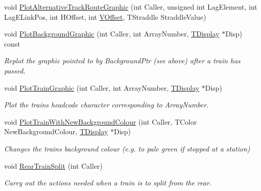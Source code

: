 \begin{DoxyCompactItemize}
\item 
void \mbox{\hyperlink{class_t_train_aa21e18b3085773ca8351c446911611c1}{Plot\+Alternative\+Track\+Route\+Graphic}} (int Caller, unsigned int Lag\+Element, int Lag\+E\+Link\+Pos, int H\+Offset, int \mbox{\hyperlink{class_t_train_a4c8b153a620229a3d9cc54f64ffa5f4a}{V\+Offset}}, T\+Straddle Straddle\+Value)
\item 
\mbox{\label{class_t_train_abb6bb7d2024ac59230cbaff2ec3ee999}} 
void \mbox{\hyperlink{class_t_train_abb6bb7d2024ac59230cbaff2ec3ee999}{Plot\+Background\+Graphic}} (int Caller, int Array\+Number, \mbox{\hyperlink{class_t_display}{T\+Display}} $\ast$Disp) const
\begin{DoxyCompactList}\small\item\em Replot the graphic pointed to by Background\+Ptr (see above) after a train has passed. \end{DoxyCompactList}\item 
\mbox{\label{class_t_train_a247bd95a7c648367736b116f553f4e54}} 
void \mbox{\hyperlink{class_t_train_a247bd95a7c648367736b116f553f4e54}{Plot\+Train\+Graphic}} (int Caller, int Array\+Number, \mbox{\hyperlink{class_t_display}{T\+Display}} $\ast$Disp)
\begin{DoxyCompactList}\small\item\em Plot the train\textquotesingle{}s headcode character corresponding to Array\+Number. \end{DoxyCompactList}\item 
\mbox{\label{class_t_train_abfa6da75d034c737d53819e6edbfa3dc}} 
void \mbox{\hyperlink{class_t_train_abfa6da75d034c737d53819e6edbfa3dc}{Plot\+Train\+With\+New\+Background\+Colour}} (int Caller, T\+Color New\+Background\+Colour, \mbox{\hyperlink{class_t_display}{T\+Display}} $\ast$Disp)
\begin{DoxyCompactList}\small\item\em Changes the train\textquotesingle{}s background colour (e.\+g. to pale green if stopped at a station) \end{DoxyCompactList}\item 
\mbox{\label{class_t_train_ad64c5823265b0c611c2e5f0613317aa5}} 
void \mbox{\hyperlink{class_t_train_ad64c5823265b0c611c2e5f0613317aa5}{Rear\+Train\+Split}} (int Caller)
\begin{DoxyCompactList}\small\item\em Carry out the actions needed when a train is to split from the rear. \end{DoxyCompactList}\item 

\end{DoxyCompactItemize}
